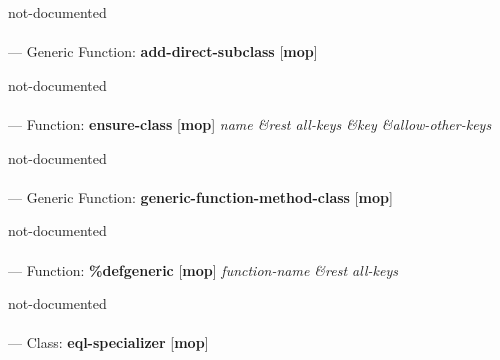 \begin{adjustwidth}{5em}{5em}
not-documented
\end{adjustwidth}

\paragraph{}
\label{MOP:ADD-DIRECT-SUBCLASS}
--- Generic Function: \textbf{add-direct-subclass} [\textbf{mop}] \textit{}

\begin{adjustwidth}{5em}{5em}
not-documented
\end{adjustwidth}

\paragraph{}
\label{MOP:ENSURE-CLASS}
--- Function: \textbf{ensure-class} [\textbf{mop}] \textit{name \&rest all-keys \&key \&allow-other-keys}

\begin{adjustwidth}{5em}{5em}
not-documented
\end{adjustwidth}

\paragraph{}
\label{MOP:GENERIC-FUNCTION-METHOD-CLASS}
--- Generic Function: \textbf{generic-function-method-class} [\textbf{mop}] \textit{}

\begin{adjustwidth}{5em}{5em}
not-documented
\end{adjustwidth}

\paragraph{}
\label{MOP:DEFGENERIC}
--- Function: \textbf{\%defgeneric} [\textbf{mop}] \textit{function-name \&rest all-keys}

\begin{adjustwidth}{5em}{5em}
not-documented
\end{adjustwidth}

\paragraph{}
\label{MOP:EQL-SPECIALIZER}
--- Class: \textbf{eql-specializer} [\textbf{mop}] \textit{}


